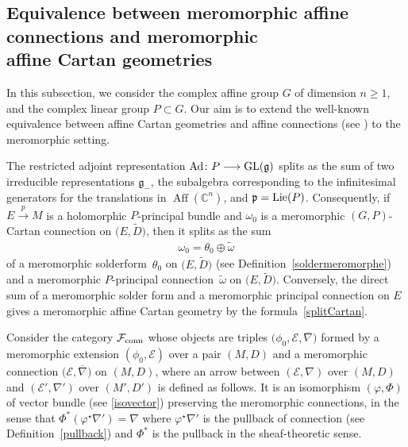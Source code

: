 \documentclass[pdftex]{sigma}
\numberwithin{equation}{section}
\begin{document}
\subsection[Equivalence between meromorphic affine connections and meromorphic affine Cartan geometries]{Equivalence between meromorphic affine connections and meromorphic \\ affine Cartan geometries}\label{sectionequivalence}

In this subsection, we consider the complex affine group $G$ of dimension $n\geq 1$, and the complex linear group $P\subset G$. Our aim is to extend the well-known equivalence between affine Cartan geometries and affine connections (see \cite[pp.~362--365]{Sharpe}) to the meromorphic setting.

The restricted adjoint representation $\operatorname{Ad}\colon P \longrightarrow {\rm GL}(\mathfrak{g})$ splits as the sum of two irreducible representations $\mathfrak{g}_-$, the subalgebra corresponding to the infinitesimal generators for the translations in $\operatorname{Aff}(\mathbb{C}^n)$, and $\mathfrak{p}={\rm Lie}(P)$. Consequently, if $E\overset{p}{\longrightarrow} M$ is a holomorphic $P$-principal bundle and $\omega_0$ is a meromorphic $(G,P)$-Cartan connection on $\big(E,\tilde{D}\big)$, then it splits as the sum
\begin{gather}\label{splitCartan} \omega_0 = \theta_0 \oplus \tilde{\omega} \end{gather}
 of a meromorphic solderform~$\theta_0$ on $\big(E,\tilde{D}\big)$ (see Definition~\ref{soldermeromorphe}) and a meromorphic $P$-principal connection~$\tilde{\omega}$ on $\big(E,\tilde{D}\big)$. Conversely, the direct sum of a meromorphic solder form and a meromorphic principal connection on $E$ gives a meromorphic affine Cartan geometry by the formula~\eqref{splitCartan}.

Consider the category $\mathcal{F}_{\rm conn}$ whose objects are triples $\big(\phi_0,\mathcal{E},\overline{\nabla}\big)$ formed by a meromorphic extension $(\phi_0,\mathcal{E})$ over a pair $(M,D)$ and a meromorphic connection $\big(\mathcal{E},\overline{\nabla}\big)$ on $(M,D)$, where an arrow between $(\mathcal{E},\nabla)$ over $(M,D)$ and $(\mathcal{E}',\nabla')$ over $(M',D')$ is defined as follows. It is an isomorphism $(\varphi,\Phi)$ of vector bundle (see \eqref{isovector}) preserving the meromorphic connections, in the sense that $\Phi^* (\varphi^\star \nabla')=\nabla$ where $\varphi^\star \nabla'$ is the pullback of connection (see Definition~\ref{pullback}) and $\Phi^*$ is the pullback in the sheaf-theoretic sense.
\end{document}
